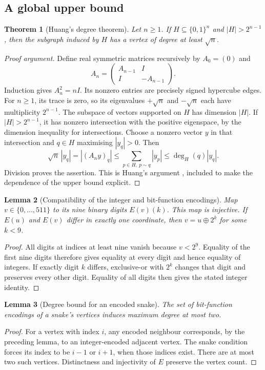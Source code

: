 \documentclass[11pt,a4paper]{article}
\newtheorem{theorem}{Theorem}[section]
\newtheorem{lemma}[theorem]{Lemma}
\theoremstyle{definition}
\theoremstyle{remark}
\begin{document}
\subsection{A global upper bound}
\begin{theorem}[Huang's degree theorem]\label{thm:huang}
Let $n\ge1$. If $H\subseteq\{0,1\}^n$ and $|H|>2^{n-1}$, then the subgraph induced by $H$ has a vertex of degree at least $\sqrt n$.
\end{theorem}
\begin{proof}[Proof argument]
Define real symmetric matrices recursively by $A_0=(0)$ and
\[
A_n=\begin{pmatrix}A_{n-1}&I\\I&-A_{n-1}\end{pmatrix}.
\]
Induction gives $A_n^2=nI$. Its nonzero entries are precisely signed hypercube edges. For $n\ge1$, its trace is zero, so its eigenvalues $+\sqrt n$ and $-\sqrt n$ each have multiplicity $2^{n-1}$. The subspace of vectors supported on $H$ has dimension $|H|$. If $|H|>2^{n-1}$, it has nonzero intersection with the positive eigenspace, by the dimension inequality for intersections. Choose a nonzero vector $y$ in that intersection and $q\in H$ maximising $|y_q|>0$. Then
\[
\sqrt n\,|y_q|=|(A_ny)_q|
\le\sum_{p\in H,\ p\sim q}|y_p|
\le \deg_H(q)|y_q|.
\]
Division proves the assertion. This is Huang's argument \cite{huang}, included to make the dependence of the upper bound explicit.
\end{proof}

\begin{lemma}[Compatibility of the integer and bit-function encodings]
Map $v\in\{0,\ldots,511\}$ to its nine binary digits $E(v)(k)$. This map is injective. If $E(u)$ and $E(v)$ differ in exactly one coordinate, then $v=u\oplus2^k$ for some $k<9$.
\end{lemma}
\begin{proof}
All digits at indices at least nine vanish because $v<2^9$. Equality of the first nine digits therefore gives equality at every digit and hence equality of integers. If exactly digit $k$ differs, exclusive-or with $2^k$ changes that digit and preserves every other digit. Equality of all digits then gives the stated integer identity.
\end{proof}

\begin{lemma}[Degree bound for an encoded snake]
The set of bit-function encodings of a snake's vertices induces maximum degree at most two.
\end{lemma}
\begin{proof}
For a vertex with index $i$, any encoded neighbour corresponds, by the preceding lemma, to an integer-encoded adjacent vertex. The snake condition forces its index to be $i-1$ or $i+1$, when those indices exist. There are at most two such vertices. Distinctness and injectivity of $E$ preserve the vertex count.
\end{proof}
\end{document}
